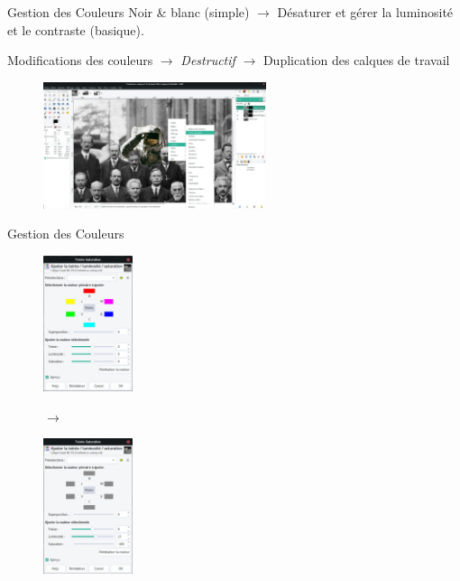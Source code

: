 \documentclass[10pt,svgnames,usenames,table]{beamer}
\begin{document}
	\begin{frame}{Gestion des Couleurs}
		Noir \& blanc (simple) $\rightarrow$ Désaturer et gérer la luminosité et le contraste (basique).
	
		Modifications des couleurs $\rightarrow$ \emph{Destructif} $\rightarrow$ Duplication des calques de travail

		\begin{figure}
			\centering
			\includegraphics[height=140px]{Images/colours/col2} 
		\end{figure}
	\end{frame}

	\begin{frame}{Gestion des Couleurs}

		\begin{figure}[H]
			\centering
			\begin{minipage}{.5\textwidth}
				\centering
				\includegraphics[height=150px]{Images/colours/col3} 
				\end{minipage}$\rightarrow$%
			\begin{minipage}{.5\textwidth}
				\centering
				\includegraphics[height=150px]{Images/colours/col4} 
				\end{minipage}
			\end{figure}	
	\end{frame}
\end{document}
